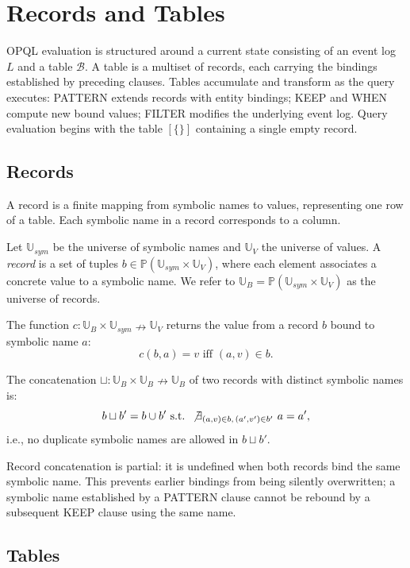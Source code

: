 \section{Records and Tables}

OPQL evaluation is structured around a current state consisting of an event log $L$ and a table $\mathcal{B}$. A table is a multiset of records, each carrying the bindings established by preceding clauses. Tables accumulate and transform as the query executes: PATTERN extends records with entity bindings; KEEP and WHEN compute new bound values; FILTER modifies the underlying event log. Query evaluation begins with the table $[\{ \}]$ containing a single empty record.

\subsection{Records}

A record is a finite mapping from symbolic names to values, representing one row of a table. Each symbolic name in a record corresponds to a column.

\begin{frameddef}[Records]
Let $\mathbb{U}_{sym}$ be the universe of symbolic names and $\mathbb{U}_V$ the universe of values. A \emph{record} is a set of tuples $b \in \mathbb{P}(\mathbb{U}_{sym} \times \mathbb{U}_V)$, where each element associates a concrete value to a symbolic name. We refer to $\mathbb{U}_B = \mathbb{P}(\mathbb{U}_{sym} \times \mathbb{U}_V)$ as the universe of records.

The function $c : \mathbb{U}_B \times \mathbb{U}_{sym} \nrightarrow \mathbb{U}_V$ returns the value from a record $b$ bound to symbolic name $a$:
\[
c(b, a) = v \text{ iff } (a, v) \in b.
\]

The concatenation $\sqcup : \mathbb{U}_B \times \mathbb{U}_B \nrightarrow \mathbb{U}_B$ of two records with distinct symbolic names is:
\[
b \sqcup b' = b \cup b' \text{ s.t. } \not\exists_{(a,v) \in b,\, (a',v') \in b'}\ a = a',
\]
i.e., no duplicate symbolic names are allowed in $b \sqcup b'$.
\end{frameddef}

Record concatenation is partial: it is undefined when both records bind the same symbolic name. This prevents earlier bindings from being silently overwritten; a symbolic name established by a PATTERN clause cannot be rebound by a subsequent KEEP clause using the same name.

\subsection{Tables}

